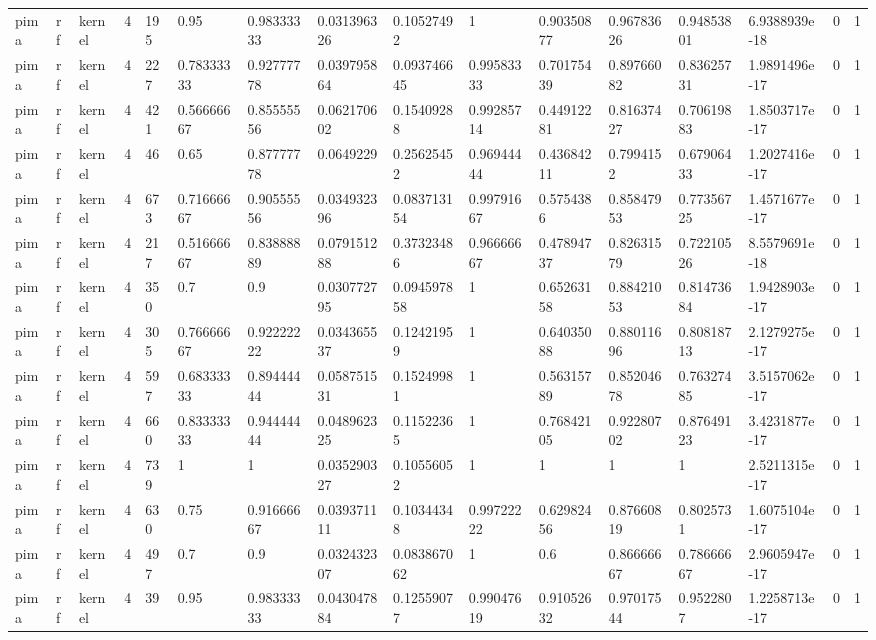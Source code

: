 \begin{tabular}{llllllllllllllll}
pima & rf & kernel & 4 & 195 & 0.95 & 0.98333333 & 0.031396326 & 0.10527492 & 1 & 0.90350877 & 0.96783626 & 0.94853801 & 6.9388939e-18 & 0 & 1 \\
pima & rf & kernel & 4 & 227 & 0.78333333 & 0.92777778 & 0.039795864 & 0.093746645 & 0.99583333 & 0.70175439 & 0.89766082 & 0.83625731 & 1.9891496e-17 & 0 & 1 \\
pima & rf & kernel & 4 & 421 & 0.56666667 & 0.85555556 & 0.062170602 & 0.15409288 & 0.99285714 & 0.44912281 & 0.81637427 & 0.70619883 & 1.8503717e-17 & 0 & 1 \\
pima & rf & kernel & 4 & 46 & 0.65 & 0.87777778 & 0.0649229 & 0.25625452 & 0.96944444 & 0.43684211 & 0.7994152 & 0.67906433 & 1.2027416e-17 & 0 & 1 \\
pima & rf & kernel & 4 & 673 & 0.71666667 & 0.90555556 & 0.034932396 & 0.083713154 & 0.99791667 & 0.5754386 & 0.85847953 & 0.77356725 & 1.4571677e-17 & 0 & 1 \\
pima & rf & kernel & 4 & 217 & 0.51666667 & 0.83888889 & 0.079151288 & 0.37323486 & 0.96666667 & 0.47894737 & 0.82631579 & 0.72210526 & 8.5579691e-18 & 0 & 1 \\
pima & rf & kernel & 4 & 350 & 0.7 & 0.9 & 0.030772795 & 0.094597858 & 1 & 0.65263158 & 0.88421053 & 0.81473684 & 1.9428903e-17 & 0 & 1 \\
pima & rf & kernel & 4 & 305 & 0.76666667 & 0.92222222 & 0.034365537 & 0.12421959 & 1 & 0.64035088 & 0.88011696 & 0.80818713 & 2.1279275e-17 & 0 & 1 \\
pima & rf & kernel & 4 & 597 & 0.68333333 & 0.89444444 & 0.058751531 & 0.15249981 & 1 & 0.56315789 & 0.85204678 & 0.76327485 & 3.5157062e-17 & 0 & 1 \\
pima & rf & kernel & 4 & 660 & 0.83333333 & 0.94444444 & 0.048962325 & 0.11522365 & 1 & 0.76842105 & 0.92280702 & 0.87649123 & 3.4231877e-17 & 0 & 1 \\
pima & rf & kernel & 4 & 739 & 1 & 1 & 0.035290327 & 0.10556052 & 1 & 1 & 1 & 1 & 2.5211315e-17 & 0 & 1 \\
pima & rf & kernel & 4 & 630 & 0.75 & 0.91666667 & 0.039371111 & 0.10344348 & 0.99722222 & 0.62982456 & 0.87660819 & 0.8025731 & 1.6075104e-17 & 0 & 1 \\
pima & rf & kernel & 4 & 497 & 0.7 & 0.9 & 0.032432307 & 0.083867062 & 1 & 0.6 & 0.86666667 & 0.78666667 & 2.9605947e-17 & 0 & 1 \\
pima & rf & kernel & 4 & 39 & 0.95 & 0.98333333 & 0.043047884 & 0.12559077 & 0.99047619 & 0.91052632 & 0.97017544 & 0.9522807 & 1.2258713e-17 & 0 & 1 \\

\end{tabular}
